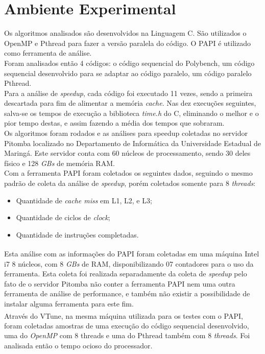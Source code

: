 \documentclass[12pt]{article}
\newcommand\tab[1][1cm]{\hspace*{#1}}
\begin{document}
\section{Ambiente Experimental}\label{sec:amb}
\tab Os algoritmos analisados são desenvolvidos na Linguagem C. São utilizados o OpenMP e Pthread para fazer a versão paralela do código. O PAPI é utilizado como ferramenta de análise. 
\\
\tab Foram analisados então 4 códigos: o código sequencial do Polybench, um código sequencial desenvolvido para se adaptar ao código paralelo, um código paralelo Pthread.
\\
\tab Para a análise de \textit{speedup}, cada código foi executado 11 vezes, sendo a primeira descartada para fim de alimentar a memória \textit{cache}. Nas dez execuções seguintes, salva-se os tempos de execução a biblioteca \textit{time.h} do C, eliminando o melhor e o pior tempo destas, e assim fazendo a média dos tempos que sobraram.
\\
\tab Os algoritmos foram rodados e as análises para speedup coletadas no servidor Pitomba localizado no Departamento de Informática da Universidade Estadual de Maringá. Este servidor conta com 60 núcleos de processamento, sendo 30 deles físico e 128 \textit{GBs} de memória RAM.
\\
\tab Com a ferramenta PAPI foram coletados os seguintes dados, seguindo o mesmo padrão de coleta da análise de \textit{speedup}, porém coletados somente para 8 \textit{threads}:
\begin{itemize}
\item Quantidade de \textit{cache miss} em L1, L2, e L3;
\item Quantidade de ciclos de \textit{clock};
\item Quantidade de instruções completadas.
\end{itemize}
\tab Esta análise com as informações do PAPI foram coletadas em  uma máquina Intel\textsuperscript{\textregistered} i7 8 núcleos, com 8 \textit{GBs} de RAM, disponibilizando 07 contadores para o uso da ferramenta. Esta coleta foi realizada separadamente da coleta de \textit{speedup} pelo fato de o servidor Pitomba não conter a ferramenta PAPI nem uma outra ferramenta de análise de performance, e também não existir a possibilidade de  instalar alguma ferramenta para este fim.
\\
\tab Através do VTune\textsuperscript{\texttrademark}, na mesma máquina utilizada para os testes com o PAPI, foram coletadas amostras de uma execução do código sequencial desenvolvido, uma do \textit{OpenMP} com 8 threads e uma do Pthread também com 8 \textit{threads}.  Foi analisada então o tempo ocioso do processador.
\end{document}
